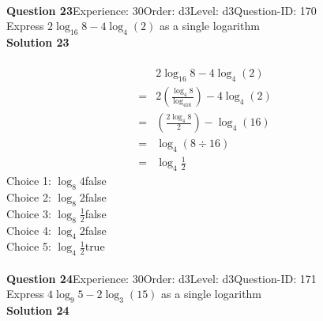 \documentclass{article}
\begin{document}
\\[4pt]
\noindent\textbf{Question 23}\hspace{20pt}Experience: 30\hspace{20pt}Order: d3\hspace{20pt}Level: d3\hspace{20pt}Question-ID: 170\\[2pt]
Express $2\log_{16}8-4\log_{4}(2)$ as a single logarithm\\[4pt]
\noindent\textbf{Solution 23}\\[2pt]
\\[-35pt]\begin{align*}
&2\log_{16}8-4\log_{4}(2)\\[2pt]
=&2\left(\displaystyle\frac{\log_{4}8}{\log_416}\right)-4\log_{4}(2)\\[2pt]
=&\left(\displaystyle\frac{2\log_{4}8}{2}\right)-\log_{4}(16)\\[2pt]
=&\log_{4}(8 \div 16)\\[2pt]
=&\log_{4}\displaystyle\frac{1}{2}
\end{align*}
Choice 1: \hspace{20pt}$\log_{8}4$\hspace{20pt}false\\
Choice 2: \hspace{20pt}$\log_{8}2$\hspace{20pt}false\\
Choice 3: \hspace{20pt}$\log_{8}\displaystyle\frac{1}{2}$\hspace{20pt}false\\
Choice 4: \hspace{20pt}$\log_{4}2$\hspace{20pt}false\\
Choice 5: \hspace{20pt}$\log_{4}\displaystyle\frac{1}{2}$\hspace{20pt}true\\
\\[4pt]
\noindent\textbf{Question 24}\hspace{20pt}Experience: 30\hspace{20pt}Order: d3\hspace{20pt}Level: d3\hspace{20pt}Question-ID: 171\\[2pt]
Express $4\log_{9}5-2\log_{3}(15)$ as a single logarithm\\[4pt]
\noindent\textbf{Solution 24}\\[2pt]
\end{document}
